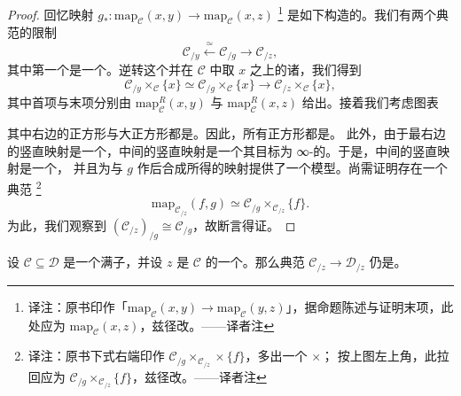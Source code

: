 \begin{proof}
回忆映射 $g_*\colon \mathrm{map}_\mathcal{C}(x, y) \to \mathrm{map}_\mathcal{C}(x, z)$%
\footnote{译注：原书印作「$\mathrm{map}_{\mathcal{C}}(x,y) \to \mathrm{map}_{\mathcal{C}}(y,z)$」，据命题陈述与证明末项，此处应为 $\mathrm{map}_{\mathcal{C}}(x,z)$，兹径改。——译者注}
是如下构造的。我们有两个典范的限制\trFunctor{}%
\[
\mathcal{C}_{/y}
\xleftarrow{\ \simeq\ }
\mathcal{C}_{/g}
\to
\mathcal{C}_{/z},
\]
其中第一个是一个\trEquivalence{}。逆转这个\trEquivalence{}并在 $\mathcal{C}$ 中取
$x$ 之上的诸\trFibre{}，我们得到
\[
\mathcal{C}_{/y} \times_\mathcal{C} \{x\}
\simeq
\mathcal{C}_{/g} \times_\mathcal{C} \{x\}
\to
\mathcal{C}_{/z} \times_\mathcal{C} \{x\},
\]
其中首项与末项分别由 $\mathrm{map}^R_\mathcal{C}(x, y)$ 与
$\mathrm{map}^R_\mathcal{C}(x, z)$ 给出。接着我们考虑图表
\begin{center}
\end{center}
其中右边的正方形与大正方形都是\trPullback{}。因此，所有正方形都是\trPullback{}。
此外，由于最右边的竖直映射是一个\trRightFibration{}，中间的竖直映射是一个其目标为
∞-\trGroupoid{}的\trRightFibration{}。于是，中间的竖直映射是一个\trKanFibration{}，
并且为与 $g$ 作后合成所得的映射提供了一个模型。尚需证明存在一个典范\trEquivalence{}%
\footnote{译注：原书下式右端印作
$\mathcal{C}_{/g} \times_{\mathcal{C}_{/z}} \times \{f\}$，多出一个 $\times$；
按上图左上角，此拉回应为
$\mathcal{C}_{/g} \times_{\mathcal{C}_{/z}} \{f\}$，兹径改。——译者注}
\[
\mathrm{map}_{\mathcal{C}_{/z}}(f, g) \simeq
\mathcal{C}_{/g} \times_{\mathcal{C}_{/z}} \{f\}.
\]
为此，我们观察到 $(\mathcal{C}_{/z})_{/g} \cong \mathcal{C}_{/g}$，故断言得证。
\end{proof}

\begin{corollary}\label{cor:slice-fully-faithful}
设 $\mathcal{C} \subseteq \mathcal{D}$ 是一个满子\trCategory{}，并设 $z$ 是
$\mathcal{C}$ 的一个\trObject{}。那么典范\trFunctor{}%
$\mathcal{C}_{/z} \to \mathcal{D}_{/z}$ 仍是\trFullyFaithful{}。
\end{corollary}

